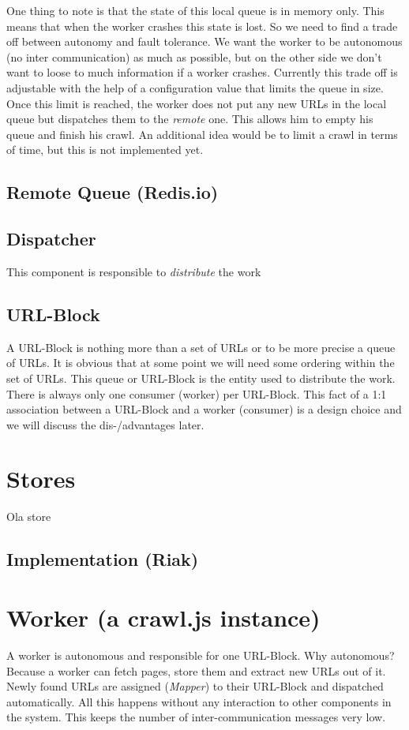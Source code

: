 \begin{itemize}
One thing to note is that the state of this local queue is in memory only. This means that when the worker crashes this state is lost. So we need to find a trade off between autonomy and fault tolerance. We want the worker to be autonomous (no inter communication) as much as possible, but on the other side we don't want to loose to much information if a worker crashes. Currently this trade off is adjustable with the help of a configuration value that limits the queue in size. Once this limit is reached, the worker does not put any new URLs in the local queue but dispatches them to the \emph{remote} one. This allows him to empty his queue and finish his crawl. An additional idea would be to limit a crawl in terms of time, but this is not implemented yet.

\subsection{Remote Queue (Redis.io)}

\subsection{Dispatcher}
This component is responsible to \emph{distribute} the work


\subsection{URL-Block}
A URL-Block is nothing more than a set of URLs or to be more precise a queue of URLs. It is obvious that at some point we will need some ordering within the set of URLs.
This queue or URL-Block is the entity used to distribute the work. There is always only one consumer (worker) per URL-Block.
This fact of a 1:1 association between a URL-Block and a worker (consumer) is a design choice and we will discuss the dis-/advantages later.

\section{Stores}
Ola store
\subsection{Implementation (Riak)}

\section{Worker (a crawl.js instance)}
\label{worker}
A worker is autonomous and responsible for one URL-Block. Why autonomous? Because a worker can fetch pages, store them and extract new URLs out of it. Newly found URLs are assigned (\emph{Mapper}) to their URL-Block and dispatched automatically. All this happens without any interaction to other components in the system. This keeps the number of inter-communication messages very low.


\end{itemize}
